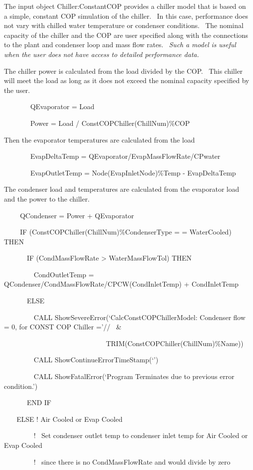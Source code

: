 The input object Chiller:ConstantCOP provides a chiller model that is based on a simple, constant COP simulation of the chiller.~ In this case, performance does not vary with chilled water temperature or condenser conditions.~ The nominal capacity of the chiller and the COP are user specified along with the connections to the plant and condenser loop and mass flow rates.~ \emph{Such a model is useful when the user does not have access to detailed performance data.}

The chiller power is calculated from the load divided by the COP.~ This chiller will meet the load as long as it does not exceed the nominal capacity specified by the user.

~~~~~~~ QEvaporator = Load

~~~~~~~ Power = Load / ConstCOPChiller(ChillNum)\%COP

Then the evaporator temperatures are calculated from the load

~~~~~~~ EvapDeltaTemp = QEvaporator/EvapMassFlowRate/CPwater

~~~~~~~ EvapOutletTemp = Node(EvapInletNode)\%Temp - EvapDeltaTemp

The condenser load and temperatures are calculated from the evaporator load and the power to the chiller.

~~~~ QCondenser = Power + QEvaporator

~~~~ IF (ConstCOPChiller(ChillNum)\%CondenserType = = WaterCooled) THEN

~~~~~~ IF (CondMassFlowRate \textgreater{} WaterMassFlowTol) THEN

~~~~~~~~ CondOutletTemp = QCondenser/CondMassFlowRate/CPCW(CondInletTemp) + CondInletTemp

~~~~~~ ELSE

~~~~~~~~ CALL ShowSevereError(`CalcConstCOPChillerModel: Condenser flow = 0, for CONST COP Chiller ='//~ \&

~~~~~~ ~~~~~~~~~~~~~~~~~~~~~~~TRIM(ConstCOPChiller(ChillNum)\%Name))

~~~~~~~~ CALL ShowContinueErrorTimeStamp(`')

~~~~~~~~ CALL ShowFatalError(`Program Terminates due to previous error condition.')

~~~~~~ END IF

~~~ ELSE ! Air Cooled or Evap Cooled

~~~~~~~~ !~ Set condenser outlet temp to condenser inlet temp for Air Cooled or Evap Cooled

~~~~~~~~ !~ since there is no CondMassFlowRate and would divide by zero

